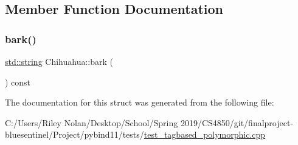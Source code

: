 \subsection{Member Function Documentation}
\mbox{\label{struct_chihuahua_acb6fbe8393fcaf91ba3e093747408834}} 
\subsubsection{\texorpdfstring{bark()}{bark()}}
{\footnotesize\ttfamily \mbox{\hyperlink{_s_d_l__opengl__glext_8h_ab4ccfaa8ab0e1afaae94dc96ef52dde1}{std\+::string}} Chihuahua\+::bark (\begin{DoxyParamCaption}{ }\end{DoxyParamCaption}) const\hspace{0.3cm}{\ttfamily [inline]}}



The documentation for this struct was generated from the following file\+:\begin{DoxyCompactItemize}
\item 
C\+:/\+Users/\+Riley Nolan/\+Desktop/\+School/\+Spring 2019/\+C\+S4850/git/finalproject-\/bluesentinel/\+Project/pybind11/tests/\mbox{\hyperlink{test__tagbased__polymorphic_8cpp}{test\+\_\+tagbased\+\_\+polymorphic.\+cpp}}\end{DoxyCompactItemize}
